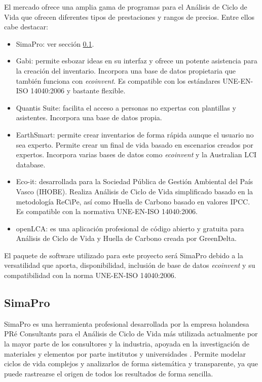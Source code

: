 El mercado ofrece una amplia gama de programas para el Análisis de Ciclo de Vida que ofrecen diferentes tipos de prestaciones y rangos de precios. Entre ellos cabe destacar:

\begin{itemize}
  \item SimaPro: ver sección \ref{sec:simapro}.
  \item Gabi: permite esbozar ideas en su interfaz y ofrece un potente asistencia para la creación del inventario. Incorpora una base de datos propietaria que también funciona con \textit{ecoinvent}. Es compatible con los estándares UNE-EN-ISO 14040:2006 y bastante flexible.
  \item Quantis Suite: facilita el acceso a personas no expertas con plantillas y asistentes. Incorpora una base de datos propia.
  \item EarthSmart: permite crear inventarios de forma rápida aunque el usuario no sea experto. Permite crear un final de vida basado en escenarios creados por expertos. Incorpora varias bases de datos como \textit{ecoinvent} y la Australian LCI database.
  \item Eco-it: desarrollada para la Sociedad Pública de Gestión Ambiental del País Vasco (IHOBE). Realiza Análisis de Ciclo de Vida simplificado basado en la metodología ReCiPe, así como Huella de Carbono basado en valores IPCC. Es compatible con la normativa UNE-EN-ISO 14040:2006.
  \item openLCA: es una aplicación profesional de código abierto y gratuita para Análisis de Ciclo de Vida y Huella de Carbono creada por GreenDelta.
\end{itemize}

El paquete de software utilizado para este proyecto será SimaPro debido a la versatilidad que aporta, disponibilidad, inclusión de base de datos \textit{ecoinvent} y su compatibilidad con la norma UNE-EN-ISO 14040:2006.

\subsection{SimaPro}\label{sec:simapro}
SimaPro es una herramienta profesional desarrollada por la empresa holandesa PRé Consultants para el Análisis de Ciclo de Vida más utilizada actualmente por la mayor parte de los consultores y la industria, apoyada en la investigación de materiales y elementos por parte institutos y universidades \cite{mgoedkoop}. Permite modelar ciclos de vida complejos y analizarlos de forma sistemática y transparente, ya que puede rastrearse el origen de todos los resultados de forma sencilla.


